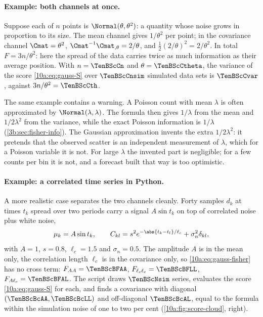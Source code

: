 \paragraph{Example: both channels at once.} Suppose each of $n$ points is $\Normal(\theta,\theta^2)$: a quantity whose
noise grows in proportion to its size. The mean channel gives $1/\theta^2$ per point; in the covariance channel
$\Cmat=\theta^2$, $\Cmat^{-1}\Cmat_{,\theta}=2/\theta$, and $\frac12(2/\theta)^2=2/\theta^2$. In total
$F=3n/\theta^2$: here the spread of the data carries twice as much information as their average position. With
$n=\TenBScCn$ and $\theta=\TenBScCtheta$, the variance of the score \eqref{10a:eq:gauss-S} over
$\TenBScCnsim$ simulated data sets is $\TenBScCvar$, against $3n/\theta^2=\TenBScCth$.

The same example contains a warning. A Poisson count with mean $\lambda$ is often approximated by
$\Normal(\lambda,\lambda)$. The formula then gives $1/\lambda$ from the mean and $1/2\lambda^2$ from the variance, while
the exact Poisson information is $1/\lambda$ (\cref{3b:sec:fisher-info}). The Gaussian approximation invents the
extra $1/2\lambda^2$: it pretends that the observed scatter is an independent measurement of $\lambda$, which for a
Poisson variable it is not. For large $\lambda$ the invented part is negligible; for a few counts per bin it is
not, and a forecast built that way is too optimistic.

\paragraph{Example: a correlated time series in Python.} A more realistic case separates the two channels cleanly.
Forty samples $d_k$ at times $t_k$ spread over two periods carry a signal $A\sin t_k$ on top of correlated noise
plus white noise,
\[
  \mu_k=A\sin t_k,\qquad
  C_{kl}=s^2e^{-\abs{t_k-t_l}/\ell_c}+\sigma_n^2\delta_{kl},
\]
with $A=1$, $s=0.8$, $\ell_c=1.5$ and $\sigma_n=0.5$. The amplitude $A$ is in the mean only, the correlation length
$\ell_c$ is in the covariance only, so \eqref{10a:eq:gauss-fisher} has no cross term:
$F_{AA}=\TenBScBFAA$, $F_{\ell_c\ell_c}=\TenBScBFLL$, $F_{A\ell_c}=\TenBScBFAL$. The script draws $\TenBScNsim$
series, evaluates the score \eqref{10a:eq:gauss-S} for each, and finds a covariance with diagonal
$(\TenBScBcAA,\TenBScBcLL)$ and off-diagonal $\TenBScBcAL$, equal to the formula within the simulation noise of
one to two per cent (\cref{10a:fig:score-cloud}, right).

